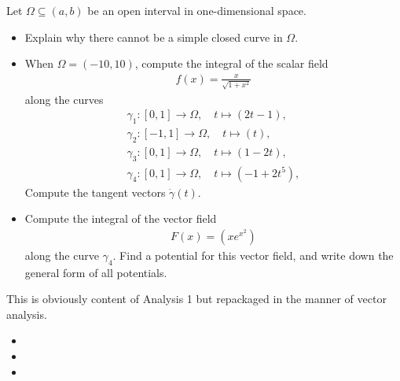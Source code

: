 \documentclass[11pt]{article}
\begin{document}
\begin{exercise}
    Let $\Omega \subseteq (a,b)$ be an open interval in one-dimensional space.
    \begin{itemize}
     \item Explain why there cannot be a simple closed curve in $\Omega$.
     \item When $\Omega = (-10,10)$, compute the integral of the scalar field 
     \begin{gather*}
        f(x) = \frac{x}{\sqrt{1+x^2}}
     \end{gather*}
     along the curves 
     \begin{gather*}
        \gamma_1 : [0,1] \rightarrow \Omega, \quad t \mapsto (2t - 1),
        \\
        \gamma_2 : [-1,1] \rightarrow \Omega, \quad t \mapsto (t),
        \\
        \gamma_3 : [0,1] \rightarrow \Omega, \quad t \mapsto (1-2t),
        \\
        \gamma_4 : [0,1] \rightarrow \Omega, \quad t \mapsto (-1 + 2t^5),
    \end{gather*}
    Compute the tangent vectors $\dot\gamma(t)$.
    \item 
    Compute the integral of the vector field 
    \begin{align}
        F(x) = \left( x e^{x^2} \right)
    \end{align}
    along the curve $\gamma_4$. Find a potential for this vector field, and write down the general form of all potentials.
    \end{itemize}
\end{exercise}
\begin{solution}
    This is obviously content of Analysis 1 but repackaged in the manner of vector analysis. 
    \begin{itemize}
        \item 
        \item 
        \item 
    \end{itemize}
\end{solution}
\end{document}
